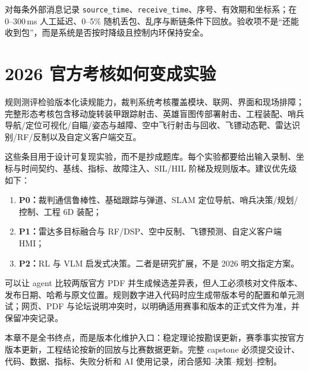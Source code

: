 \begin{engineeringcheck}
对每条外部消息记录 \texttt{source\_time}、\texttt{receive\_time}、序号、有效期和坐标系；在 0--300\,ms 人工延迟、0--5\% 随机丢包、乱序与断链条件下回放。验收项不是“还能收到包”，而是系统是否按时降级且控制内环保持安全。
\end{engineeringcheck}

\section{2026 官方考核如何变成实验}

规则测评检验版本化读规能力，裁判系统考核覆盖模块、联网、界面和现场排障；完整形态考核包含移动旋转装甲跟踪射击、英雄盲图传部署射击、工程装配、哨兵导航/定位可视化/自瞄/姿态与越障、空中飞行射击与回收、飞镖动态靶、雷达识别/RF/反制以及自定义客户端交互\cite{rmuc2026_rule_quiz,rmuc2026_referee_assessment,rmuc2026_assessment_full,rmuc2026_assessment_details}。

这些条目用于设计可复现实验，而不是抄成题库。每个实验都要给出输入录制、坐标与时间契约、基线、指标、故障注入、SIL/HIL 阶梯及规则版本。建议优先级如下：

\begin{enumerate}
  \item \textbf{P0：}裁判通信鲁棒性、基础跟踪与弹道、SLAM 定位导航、哨兵决策/规划/控制、工程 6D 装配；
  \item \textbf{P1：}雷达多目标融合与 RF/DSP、空中反制、飞镖预测、自定义客户端 HMI；
  \item \textbf{P2：}RL 与 VLM 启发式决策。二者是研究扩展，不是 2026 明文指定方案。
\end{enumerate}

\begin{aiverify}
可以让 agent 比较两版官方 PDF 并生成候选差异表，但人工必须核对文件版本、发布日期、哈希与原文位置。规则数字进入代码时应生成带版本号的配置和单元测试；网页、PDF 与论坛说明冲突时，以明确适用赛事和版本的正式文件为准，并保留冲突记录。
\end{aiverify}

\begin{chaptertransition}
本章不是全书终点，而是版本化维护入口：稳定理论按勘误更新，赛季事实按官方版本更新，工程结论按新的回放与比赛数据更新。完整 capstone 必须提交设计、代码、数据、指标、失败分析和 AI 使用记录，闭合感知--决策--规划--控制。
\end{chaptertransition}
